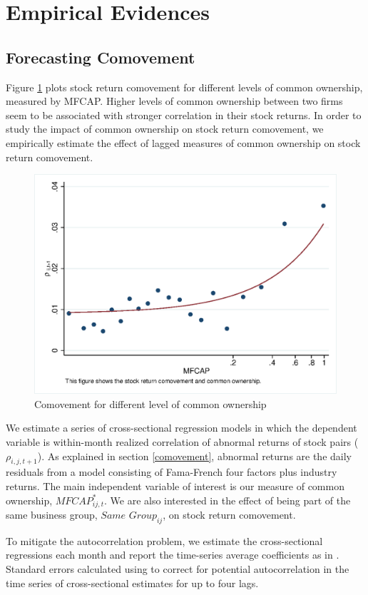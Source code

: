 
\section{Empirical Evidences}



\subsection{{Forecasting Comovement}}
\label{Forecasting Comovement}

	Figure \ref{mcorr50} plots stock return comovement for different levels of common ownership, measured by MFCAP.  Higher levels of common	ownership between two firms seem to be associated with stronger correlation in their stock returns. In order to study the impact of common ownership on stock return comovement, we empirically estimate the effect of lagged measures of common ownership on stock return comovement. 
	\begin{figure}[htbp]
	\centering  
	\centering
	\includegraphics[width=0.7\linewidth]{"Output/mcorr50.eps"} 
	\caption{Comovement for different level of common ownership }
	\label{mcorr50}
\end{figure}
	
	We estimate a series of cross-sectional regression models in which the dependent variable is within-month realized correlation of abnormal returns of stock pairs ($\rho_{i,j,t+1}$). As explained in section \ref{comovement}, abnormal returns are the daily residuals from a model consisting of Fama-French four factors plus industry returns. The main independent variable of interest is our measure of common ownership, $\textit{MFCAP}^*_{ij,t}$. We are also interested in the effect of being part of the same business group,  $\textit{Same Group}_{ij} $, on stock return comovement.
		

	
	To mitigate the autocorrelation problem, we estimate the cross-sectional regressions each month and report the time-series average coefficients as in \cite{FamaMacBeth}. Standard errors calculated using  \cite{newey1987hypothesis} to correct for potential autocorrelation in the time series of cross-sectional estimates for up to four lags. %
	
